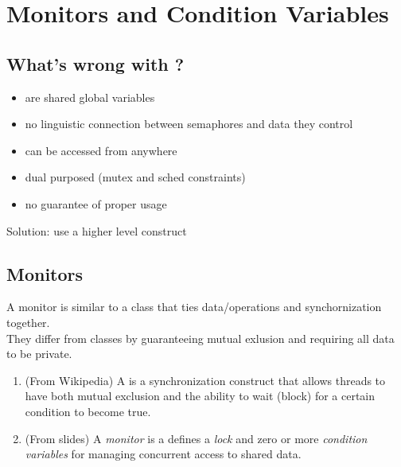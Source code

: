 \setcounter{chapter}{8}
\chapter{Monitors and Condition Variables}

\section{What's wrong with ?}
\begin{itemize}
    \item are shared global variables
    \item no linguistic connection between semaphores and data they control
    \item can be accessed from anywhere
    \item dual purposed (mutex and sched constraints)
    \item no guarantee of proper usage
\end{itemize}

Solution: use a higher level construct

\section{Monitors}
A monitor is similar to a class that ties data/operations and
synchornization together. \\

They differ from classes by guaranteeing mutual exlusion and requiring all data
to be private.

\begin{dfn} 
    \begin{enumerate}
        \item (From Wikipedia) A  is a synchronization construct
            that allows threads to have both mutual exclusion and the ability to
            wait (block) for a certain condition to become true.
        \item (From slides) A \emph{monitor} is a defines a \emph{lock} and zero
            or more \emph{condition variables} for managing concurrent access to
            shared data.
    \end{enumerate}
\end{dfn}

